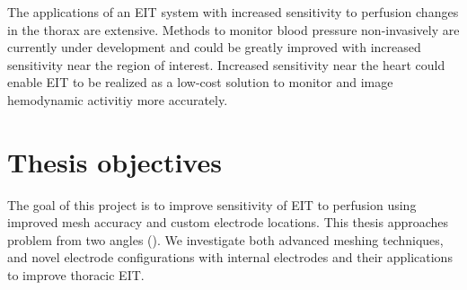 The applications of an EIT system with increased sensitivity to perfusion changes
in the thorax are extensive. Methods to monitor blood pressure non-invasively are 
currently under development and could be greatly improved with increased sensitivity 
near the region of interest. Increased sensitivity near the heart 
could enable EIT to be realized as a low-cost solution to monitor and image
hemodynamic activitiy more accurately.  

\section{Thesis objectives}
The goal of this project is to improve sensitivity of EIT to perfusion using 
improved mesh accuracy and custom electrode locations. This thesis approaches problem 
from two angles (). We investigate both
advanced meshing techniques, and novel electrode configurations
with internal electrodes and their applications to improve thoracic EIT.

